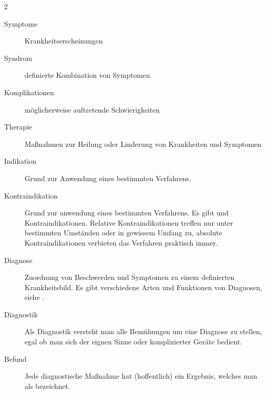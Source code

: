 {

\begin{multicols}{2}
\begin{description}
  \item[Symptome]
  Krankheitserscheinungen
  
  \item[Syndrom]
  definierte Kombination von Symptomen
  
  \item[Komplikationen]
  möglicherweise auftretende Schwierigkeiten
  \item[Therapie]  Ma{\ss}nahmen zur
  Heilung oder Linderung von Krankheiten und Symptomen
  
  \item[Indikation] Grund zur Anwendung eines bestimmten
  Verfahrens.
  \item[Kontraindikation] Grund zur \-an\-wendung
  eines bestimmten Verfahrens. Es gibt  und 
  Kontraindikationen. Relative Kontraindikationen treffen nur
  unter bestimmten Umständen oder in gewissem Umfang zu,
  absolute Kontraindikationen verbieten das Verfahren
  praktisch immer.
  \item[Diagnose] Zuordnung von Beschwerden und Symptomen zu
  einem definierten Krankheitsbild. Es gibt verschiedene Arten
  und Funktionen von Diagnosen, siehe
  .
  \item[Diagnostik]
  
  Als Diagnostik versteht man alle Bemühungen um eine
  Diagnose zu stellen, egal ob man sich der eignen Sinne
  oder komplizierter Geräte bedient.
  
  \item[Befund]
  
  Jede diagnostische Maßnahme hat (hoffentlich) ein
  Ergebnis, welches man als
   bezeichnet.
\end{description}
\end{multicols}
}
{}
{}
{}
{}




